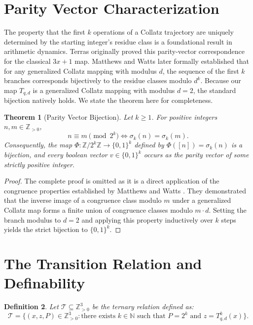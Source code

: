 \documentclass[11pt]{article}
\newtheorem{theorem}{Theorem}
\newtheorem{definition}[theorem]{Definition}
\begin{document}
\section{Parity Vector Characterization}

The property that the first $k$ operations of a Collatz trajectory are uniquely determined by the starting integer's residue class is a foundational result in arithmetic dynamics. Terras \cite{Terras} originally proved this parity-vector correspondence for the classical $3x+1$ map. Matthews and Watts \cite{MatthewsWatts} later formally established that for any generalized Collatz mapping with modulus $d$, the sequence of the first $k$ branches corresponds bijectively to the residue classes modulo $d^k$. Because our map $T_{q,d}$ is a generalized Collatz mapping with modulus $d=2$, the standard bijection natively holds. We state the theorem here for completeness.

\begin{theorem}[Parity Vector Bijection] \label{lem:characterization}
Let $k \ge 1$. For positive integers $n, m \in \mathbb{Z}_{>0}$,
$$ n \equiv m \pmod{2^k} \iff \sigma_k(n) = \sigma_k(m). $$
Consequently, the map $\Phi : \mathbb{Z}/2^k\mathbb{Z} \to \{0,1\}^k$ defined by $\Phi([n]) = \sigma_k(n)$ is a bijection, and every boolean vector $v \in \{0,1\}^k$ occurs as the parity vector of some strictly positive integer.
\end{theorem}

\begin{proof}
The complete proof is omitted as it is a direct application of the congruence properties established by Matthews and Watts \cite{MatthewsWatts}. They demonstrated that the inverse image of a congruence class modulo $m$ under a generalized Collatz map forms a finite union of congruence classes modulo $m \cdot d$. Setting the branch modulus to $d=2$ and applying this property inductively over $k$ steps yields the strict bijection to $\{0,1\}^k$. 
\end{proof}

\section{The Transition Relation and Definability}

\begin{definition} \label{def:transition}
Let $\mathcal{T} \subseteq \mathbb{Z}_{>0}^3$ be the ternary relation defined as:
\[
\mathcal{T} = \{(x, z, P) \in \mathbb{Z}_{>0}^3 : \text{there exists } k \in \mathbb{N} \text{ such that } P = 2^k \text{ and } z = T_{q,d}^k(x)\}.
\]
\end{definition}
\end{document}
